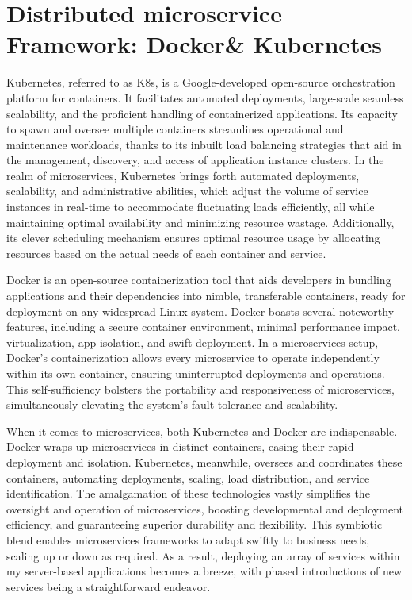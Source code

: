 \documentclass[12pt,two side]{report}
\begin{document}
\section{Distributed microservice Framework: Docker\cite{docker_website}\& Kubernetes\cite{kubernetes_website}}
Kubernetes, referred to as K8s, is a Google-developed open-source orchestration platform for containers. It facilitates automated deployments, large-scale seamless scalability, and the proficient handling of containerized applications. Its capacity to spawn and oversee multiple containers streamlines operational and maintenance workloads, thanks to its inbuilt load balancing strategies that aid in the management, discovery, and access of application instance clusters. In the realm of microservices, Kubernetes brings forth automated deployments, scalability, and administrative abilities, which adjust the volume of service instances in real-time to accommodate fluctuating loads efficiently, all while maintaining optimal availability and minimizing resource wastage. Additionally, its clever scheduling mechanism ensures optimal resource usage by allocating resources based on the actual needs of each container and service.\newline

Docker is an open-source containerization tool that aids developers in bundling applications and their dependencies into nimble, transferable containers, ready for deployment on any widespread Linux system. Docker boasts several noteworthy features, including a secure container environment, minimal performance impact, virtualization, app isolation, and swift deployment. In a microservices setup, Docker's containerization allows every microservice to operate independently within its own container, ensuring uninterrupted deployments and operations. This self-sufficiency bolsters the portability and responsiveness of microservices, simultaneously elevating the system's fault tolerance and scalability.\newline

When it comes to microservices, both Kubernetes and Docker are indispensable. Docker wraps up microservices in distinct containers, easing their rapid deployment and isolation. Kubernetes, meanwhile, oversees and coordinates these containers, automating deployments, scaling, load distribution, and service identification. The amalgamation of these technologies vastly simplifies the oversight and operation of microservices, boosting developmental and deployment efficiency, and guaranteeing superior durability and flexibility. This symbiotic blend enables microservices frameworks to adapt swiftly to business needs, scaling up or down as required. As a result, deploying an array of services within my server-based applications becomes a breeze, with phased introductions of new services being a straightforward endeavor.
\end{document}
